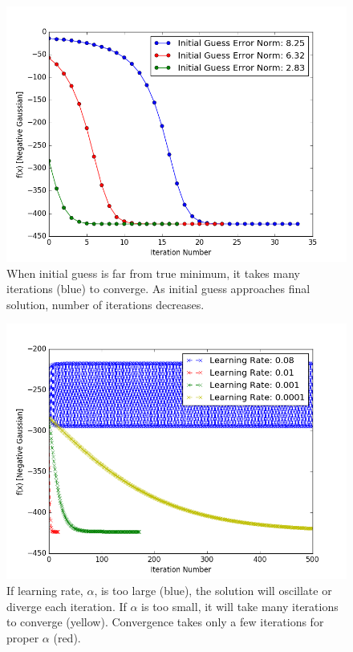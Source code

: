 \begin{figure}
	\centering
	\includegraphics [trim=0 0 0 0, clip, angle=0, width=0.8\columnwidth,
	keepaspectratio]{figures/1_1_initial_guess}
	\caption{When initial guess is far from true minimum, it takes many iterations (blue) to converge. As initial guess approaches final solution, number of iterations decreases.} 
	\label{fig:initial_guess} 
\end{figure}

\begin{figure}
	\centering
	\includegraphics [trim=0 0 0 0, clip, angle=0, width=0.8\columnwidth,
	keepaspectratio]{figures/1_1_step_size}
	\caption{If learning rate, $\alpha$, is too large (blue), the solution will oscillate or diverge each iteration. If $\alpha$ is too small, it will take many iterations to converge (yellow). Convergence takes only a few iterations for proper $\alpha$ (red).} 
	\label{fig:learning_rate} 
\end{figure}

